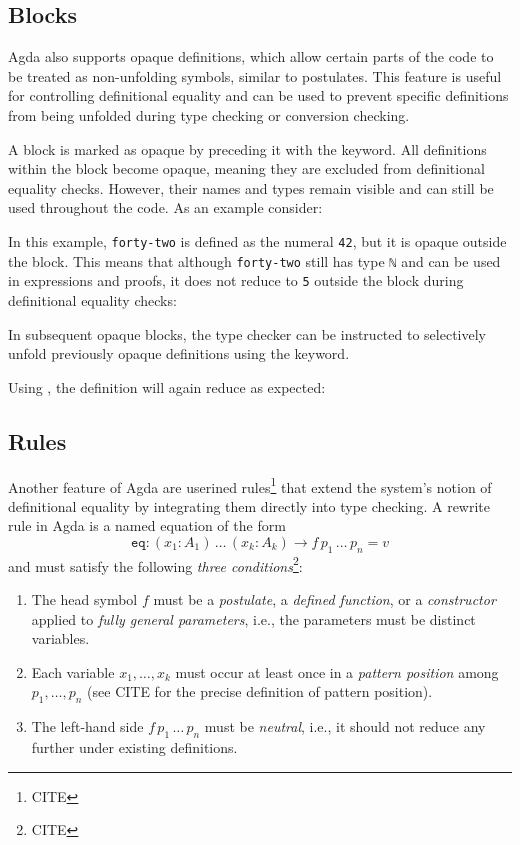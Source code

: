 \documentclass[screen,nonacm]{acmart}
\begin{document}
\subsection*{ Blocks}

Agda also supports opaque definitions, which allow certain parts of the code to
be treated as non-unfolding symbols, similar to postulates. This feature is
useful for controlling definitional equality and can be used to prevent
specific definitions from being unfolded during type checking or conversion
checking.

A block is marked as opaque by preceding it with the 
keyword. All definitions within the block become opaque, meaning they are
excluded from definitional equality checks. However, their names and types
remain visible and can still be used throughout the code. As an example
consider: \EOpaque{}

In this example, \verb|forty-two| is defined as the numeral \verb|42|, but it
is opaque outside the block. This means that although \verb|forty-two| still
has type \verb|ℕ| and can be used in expressions and proofs, it does not reduce
to \verb|5| outside the block during definitional equality checks: \EOpaqueExO

In subsequent opaque blocks, the type checker can be instructed to selectively
unfold previously opaque definitions using the  keyword.

Using , the definition will again reduce as expected:
\EOpaqueExT{}

\subsection*{ Rules}

Another feature of Agda are userined  rules\footnote{CITE}
that extend the system’s notion of definitional equality by integrating them
directly into type checking. A rewrite rule in Agda is a named equation of the
form
\[
      \texttt{eq} : (x_1 : A_1)\, \ldots\, (x_k : A_k) \to f\, p_1\, \ldots\, p_n = v
\]
and must satisfy the following \emph{three conditions}\footnote{CITE}:
\begin{enumerate}
      \item The head symbol $f$ must be a \emph{postulate}, a \emph{defined function}, or a
            \emph{constructor} applied to \emph{fully general parameters}, i.e., the
            parameters must be distinct variables.
      \item Each variable $x_1, \ldots, x_k$ must occur at least once in a \emph{pattern
                  position} among $p_1, \ldots, p_n$ (see CITE for the precise definition of
            pattern position).
      \item The left-hand side $f\, p_1\, \ldots\, p_n$ must be \emph{neutral}, i.e., it
            should not reduce any further under existing definitions.
\end{enumerate}
\end{document}
